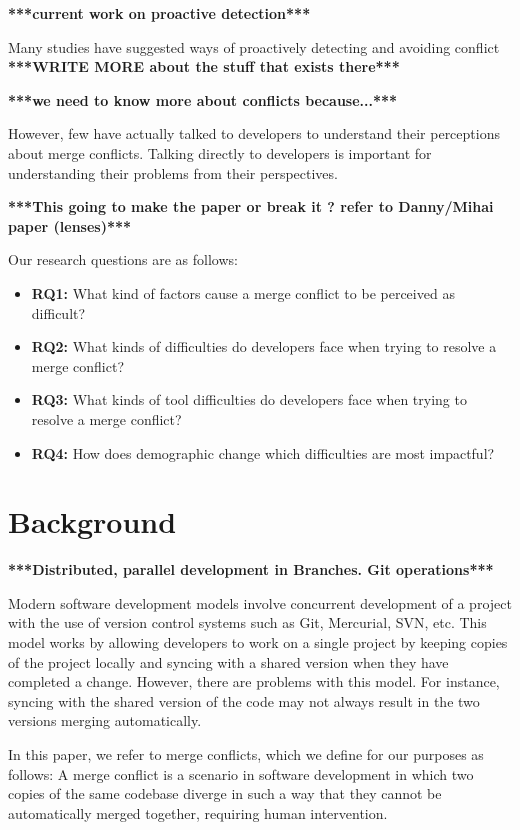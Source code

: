 \documentclass[conference]{IEEEtran}
\begin{document}
\textbf{***current work on proactive detection***}

Many studies have suggested ways of proactively detecting and avoiding conflict \cite{Brun2011} \cite{palantir} \textbf{***WRITE MORE about the stuff that exists there***}

\textbf{***we need to know more about conflicts because...***}

However, few have actually talked to developers to understand their perceptions about merge conflicts. Talking directly to developers is important for understanding their problems from their perspectives. 

\textbf{***This going to make the paper or break it ? refer to Danny/Mihai paper (lenses)***}

Our research questions are as follows:
\begin{itemize}
\item\textbf{RQ1:} What kind of factors cause a merge conflict to be perceived as difficult?\\
\item\textbf{RQ2:} What kinds of difficulties do developers face when trying to resolve a merge conflict?\\
\item\textbf{RQ3:} What kinds of tool difficulties do developers face when trying to resolve a merge conflict?\\
\item\textbf{RQ4:} How does demographic change which difficulties are most impactful?\\
\end{itemize}

\section{Background}

\textbf{***Distributed, parallel development in Branches. Git operations***}

Modern software development models involve concurrent development of a project with the use of version control systems such as Git, Mercurial, SVN, etc. This model works by allowing developers to work on a single project by keeping copies of the project locally and syncing with a shared version when they have completed a change. However, there are problems with this model. For instance, syncing with the shared version of the code may not always result in the two versions merging automatically.

In this paper, we refer to merge conflicts, which we define for our purposes as follows:
A merge conflict is a scenario in software development in which two copies of the same codebase diverge in such a way that they cannot be automatically merged together, requiring human intervention. 
\end{document}
